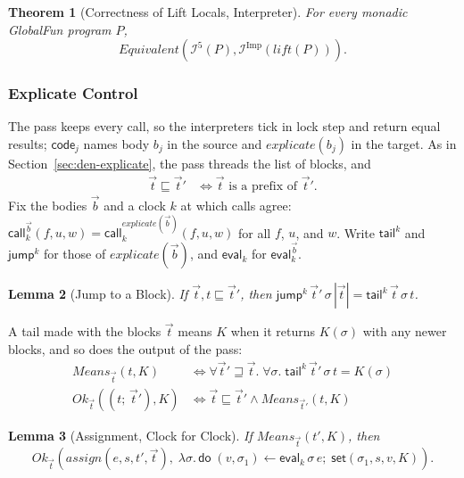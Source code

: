 \documentclass[10pt]{article}
\theoremstyle{acmplain}
\newtheorem{theorem}{Theorem}[section]
\newtheorem{lemma}[theorem]{Lemma}
\newcommand{\key}[1]{\mathsf{#1}}
\newcommand{\pass}[1]{\mathit{#1}}
\newcommand{\Equiv}{\mathit{Equivalent}}
\newcommand{\codeV}[1]{\key{code}_{#1}}
\newcommand{\Do}{\key{do}\;}
\newcommand{\EV}[2]{\key{eval}^{#1}_{#2}}
\newcommand{\CALL}[2]{\key{call}^{#1}_{#2}}
\newcommand{\Interp}[1]{\mathcal{I}^{#1}}
\begin{document}
\begin{theorem}[Correctness of Lift Locals, Interpreter]\label{thm:lift-clk}
For every monadic GlobalFun program $P$,
\[
  \Equiv(\Interp{5}(P), \Interp{\mathrm{Imp}}(\pass{lift}(P))) .
\]
\end{theorem}

\subsubsection{Explicate Control}

The pass keeps every call, so the interpreters tick in lock step and
return equal results; $\codeV{j}$ names body $b_j$ in the source and
$\pass{explicate}(b_j)$ in the target. As in
Section~\ref{sec:den-explicate}, the pass threads the list of blocks, and
\begin{align*}
  \vec{t} \sqsubseteq \vec{t}' &\iff \vec{t} \text{ is a prefix of } \vec{t}' .
\end{align*}
Fix the bodies $\vec{b}$ and a clock $k$ at which calls agree:
$\CALL{\vec{b}}{k}(f, u, w) = \CALL{\pass{explicate}(\vec{b})}{k}(f, u, w)$
for all $f$, $u$, and $w$. Write $\key{tail}^k$ and $\key{jump}^k$ for
those of $\pass{explicate}(\vec{b})$, and $\EV{}{k}$ for $\EV{\vec{b}}{k}$.

\begin{lemma}[Jump to a Block]\label{lem:jump-at}
If $\vec{t}, t \sqsubseteq \vec{t}'$, then
$\key{jump}^k\,\vec{t}'\,\sigma\,|\vec{t}| = \key{tail}^k\,\vec{t}\,\sigma\,t$.
\end{lemma}

A tail made with the blocks $\vec{t}$ means $K$ when it returns
$K(\sigma)$ with any newer blocks, and so does the output of the pass:
\begin{align*}
  \mathit{Means}_{\vec{t}}(t, K) &\iff \forall \vec{t}' \sqsupseteq \vec{t}.\; \forall \sigma.\;
    \key{tail}^k\,\vec{t}'\,\sigma\,t = K(\sigma) \\
  \mathit{Ok}_{\vec{t}}((t;\, \vec{t}'), K) &\iff \vec{t} \sqsubseteq \vec{t}' \land \mathit{Means}_{\vec{t}'}(t, K)
\end{align*}

\begin{lemma}[Assignment, Clock for Clock]\label{lem:assign-ok}
If $\mathit{Means}_{\vec{t}}(t', K)$, then
\[
  \mathit{Ok}_{\vec{t}}(\pass{assign}(e, s, t', \vec{t}),\;
    \lambda \sigma.\, \Do (v, \sigma_1) \leftarrow \EV{}{k}\,\sigma\,e;\; \key{set}(\sigma_1, s, v, K)) .
\]
\end{lemma}
\end{document}
